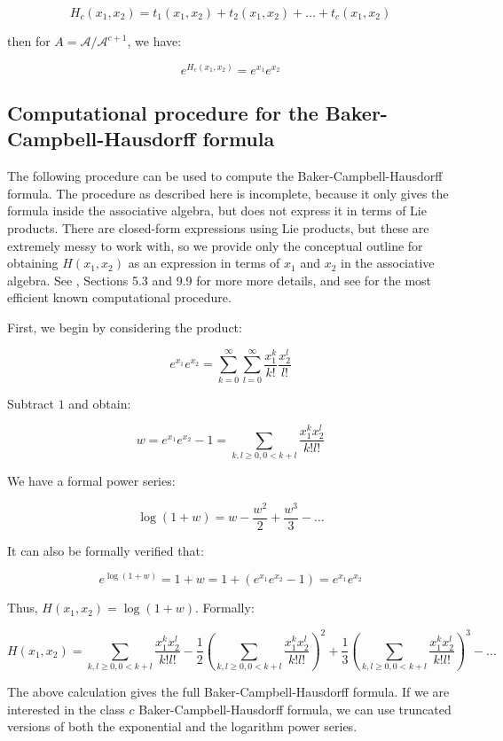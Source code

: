 $$H_c(x_1,x_2) = t_1(x_1,x_2) + t_2(x_1,x_2) + \dots + t_c(x_1,x_2)$$

then for $A = \mathcal{A}/\mathcal{A}^{c+1}$, we have:

$$e^{H_c(x_1,x_2)} = e^{x_1}e^{x_2}$$

\subsection{Computational procedure for the Baker-Campbell-Hausdorff formula}\label{sec:bch-computation}

The following procedure can be used to compute the
Baker-Campbell-Hausdorff formula. The procedure as described here is
incomplete, because it only gives the formula inside the associative
algebra, but does not express it in terms of Lie products. There are
closed-form expressions using Lie products, but these are extremely
messy to work with, so we provide only the conceptual outline for
obtaining $H(x_1,x_2)$ as an expression in terms of $x_1$ and $x_2$ in
the associative algebra. See \cite{Khukhro}, Sections 5.3 and 9.9 for
more more details, and see \cite{Lazardeffective} for the most
efficient known computational procedure.

First, we begin by considering the product:

$$e^{x_1}e^{x_2} = \sum_{k=0}^\infty \sum_{l=0}^\infty \frac{x_1^k}{k!}\frac{x_2^l}{l!}$$

Subtract $1$ and obtain:

$$w = e^{x_1}e^{x_2} - 1 = \sum_{k,l \ge 0, 0 < k + l} \frac{x_1^kx_2^l}{k!l!}$$

We have a formal power series:

$$\log(1 + w) = w - \frac{w^2}{2} + \frac{w^3}{3} - \dots $$

It can also be formally verified that:

$$e^{\log(1 + w)} = 1 + w = 1 + (e^{x_1}e^{x_2} - 1) = e^{x_1}e^{x_2}$$

Thus, $H(x_1,x_2) = \log(1 + w)$. Formally:

$$H(x_1,x_2) = \sum_{k,l \ge 0, 0 < k + l} \frac{x_1^kx_2^l}{k!l!} - \frac{1}{2}\left(\sum_{k,l \ge 0, 0 < k + l} \frac{x_1^kx_2^l}{k!l!}\right)^2 + \frac{1}{3}\left(\sum_{k,l \ge 0, 0 < k + l} \frac{x_1^kx_2^l}{k!l!}\right)^3 - \dots$$

The above calculation gives the full Baker-Campbell-Hausdorff
formula. If we are interested in the class $c$
Baker-Campbell-Hausdorff formula, we can use truncated versions of
both the exponential and the logarithm power series.

